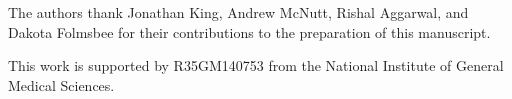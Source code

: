 \documentclass[journal=jmcmar,manuscript=article]{achemso}
\begin{document}
\begin{acknowledgement}

The authors thank Jonathan King, Andrew McNutt, Rishal Aggarwal, and Dakota Folmsbee for their contributions to the preparation of this manuscript.

This work is supported by R35GM140753 from the National Institute of General Medical Sciences.

\end{acknowledgement}




\end{document}
